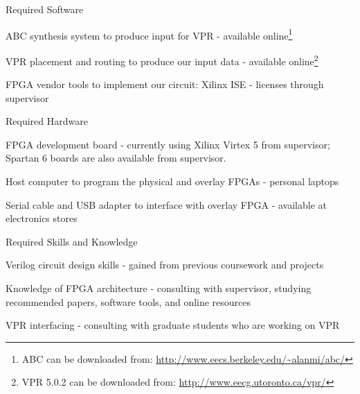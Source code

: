 \begin{itemlist}
	\item Required Software \
		\begin{itemlist}
			\item ABC synthesis system to produce input for VPR - available online\footnote{ABC can be downloaded from: \url{http://www.eecs.berkeley.edu/~alanmi/abc/}}
			\item VPR placement and routing to produce our input data - available online\footnote{VPR 5.0.2 can be downloaded from: \url{http://www.eecg.utoronto.ca/vpr/}}
			\item FPGA vendor tools to implement our circuit: Xilinx ISE - licenses through supervisor
		\end{itemlist}
	\item Required Hardware \
		\begin{itemlist}
			\item FPGA development board - currently using Xilinx Virtex 5 from supervisor; Spartan 6 boards are also available from supervisor.
			\item Host computer to program the physical and overlay FPGAs - personal laptops
			\item Serial cable and USB adapter to interface with overlay FPGA - available at electronics stores
		\end{itemlist}
	\item Required Skills and Knowledge \
		\begin{itemlist}
			\item Verilog circuit design skills - gained from previous coursework and projects
			\item Knowledge of FPGA architecture - consulting with supervisor, studying recommended papers, software tools, and online resources
			\item VPR interfacing - consulting with graduate students who are working on VPR
		\end{itemlist}
\end{itemlist}


